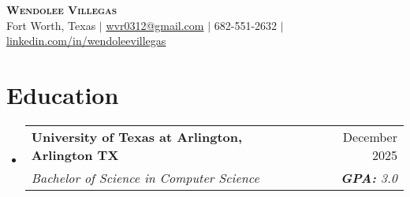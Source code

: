 \documentclass[letterpaper,11pt]{article}
\makeatletter
\newcommand{\resumeItem}[1]{
  \item\small{
    {#1 \vspace{-2pt}}
  }
}
\newcommand{\resumeSubheading}[4]{
  \vspace{-2pt}\item
    \begin{tabular*}{0.97\textwidth}[t]{l@{\extracolsep{\fill}}r}
      \textbf{#1} & #2 \\
      \textit{\small#3} & \textit{\small #4} \\
    \end{tabular*}\vspace{-7pt}
}
\newcommand{\resumeSubHeadingListStart}{\begin{itemize}[leftmargin=0.15in, label={}]}
\newcommand{\resumeSubHeadingListEnd}{\end{itemize}}
\makeatother
\begin{document}

\begin{center}
    \textbf{\Huge \scshape Wendolee Villegas} \\ \vspace{1pt}
    \small Fort Worth, Texas $|$ \href{mailto:x@x.com}{{wvr0312@gmail.com}} $|$ \small 682-551-2632 $|$
    \href{https://www.linkedin.com/in/wendolee-villegas-565440252/}{{linkedin.com/in/wendoleevillegas}}
\end{center}


\section{Education}
  \resumeSubHeadingListStart
    \resumeSubheading
      {University of Texas at Arlington, Arlington TX}{December 2025}
      {Bachelor of Science in Computer Science}{\textbf{GPA:} 3.0}
  \resumeSubHeadingListEnd

\end{document}
